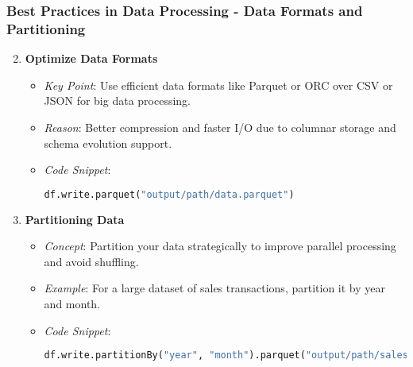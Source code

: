 \documentclass[aspectratio=169]{beamer}
\begin{document}
\begin{frame}[fragile]
    \frametitle{Best Practices in Data Processing - Data Formats and Partitioning}
    \begin{enumerate}
        \setcounter{enumi}{1}
        \item \textbf{Optimize Data Formats}
        \begin{itemize}
            \item \textit{Key Point}: Use efficient data formats like Parquet or ORC over CSV or JSON for big data processing.
            \item \textit{Reason}: Better compression and faster I/O due to columnar storage and schema evolution support.
            \item \textit{Code Snippet}:
            \begin{lstlisting}[language=python]
            df.write.parquet("output/path/data.parquet")
            \end{lstlisting}
        \end{itemize}

        \item \textbf{Partitioning Data}
        \begin{itemize}
            \item \textit{Concept}: Partition your data strategically to improve parallel processing and avoid shuffling.
            \item \textit{Example}: For a large dataset of sales transactions, partition it by year and month.
            \item \textit{Code Snippet}:
            \begin{lstlisting}[language=python]
            df.write.partitionBy("year", "month").parquet("output/path/sales")
            \end{lstlisting}
        \end{itemize}
    \end{enumerate}
\end{frame}
\end{document}
